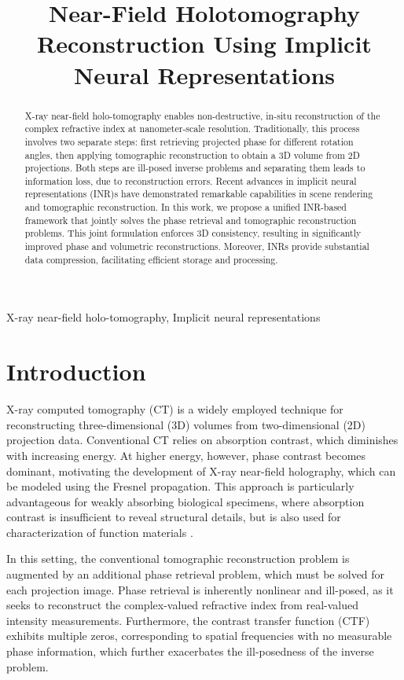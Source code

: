 \documentclass{article}
\title{Near-Field Holotomography Reconstruction Using Implicit Neural Representations}
\begin{document}
%
\maketitle
%
\begin{abstract}
X-ray near-field holo-tomography enables non-destructive, in-situ reconstruction of the complex refractive index at nanometer-scale resolution.
Traditionally, this process involves two separate steps: first retrieving projected phase for different rotation angles, then applying tomographic reconstruction to obtain a 3D volume from 2D projections.
Both steps are ill-posed inverse problems and separating them leads to information loss, due to reconstruction errors.
Recent advances in implicit neural representations (INR)s have demonstrated remarkable capabilities in scene rendering and tomographic reconstruction.
In this work, we propose a unified INR-based framework that jointly solves the phase retrieval and tomographic reconstruction problems.
This joint formulation enforces 3D consistency, resulting in significantly improved phase and volumetric reconstructions.
Moreover, INRs provide substantial data compression, facilitating efficient storage and processing.
\end{abstract}
%
\begin{keywords}
X-ray near-field holo-tomography, Implicit neural representations
\end{keywords}
%
\section{Introduction}
\label{sec:intro}
X-ray computed tomography (CT) is a widely employed technique for reconstructing three-dimensional (3D) volumes from two-dimensional (2D) projection data.
Conventional CT relies on absorption contrast, which diminishes with increasing energy. 
At higher energy, however, phase contrast becomes dominant, motivating the development of X-ray near-field holography, which can be modeled using the Fresnel propagation.
This approach is particularly advantageous for weakly absorbing biological specimens, where absorption contrast is insufficient to reveal structural details, but is also used for characterization of function materials \cite{vesely3DXrayNanotomography2021a,flennerHardXrayNanoholotomography2020b,gerhardtThreedimensionalArchitectureLinearized2025,reimersDevelopmentBioreactorCoupledFlowCell2023}.

In this setting, the conventional tomographic reconstruction problem is augmented by an additional phase retrieval problem, which must be solved for each projection image.
Phase retrieval is inherently nonlinear and ill-posed, as it seeks to reconstruct the complex-valued refractive index from real-valued intensity measurements.
Furthermore, the contrast transfer function (CTF) exhibits multiple zeros, corresponding to spatial frequencies with no measurable phase information, which further exacerbates the ill-posedness of the inverse problem.
\end{document}
